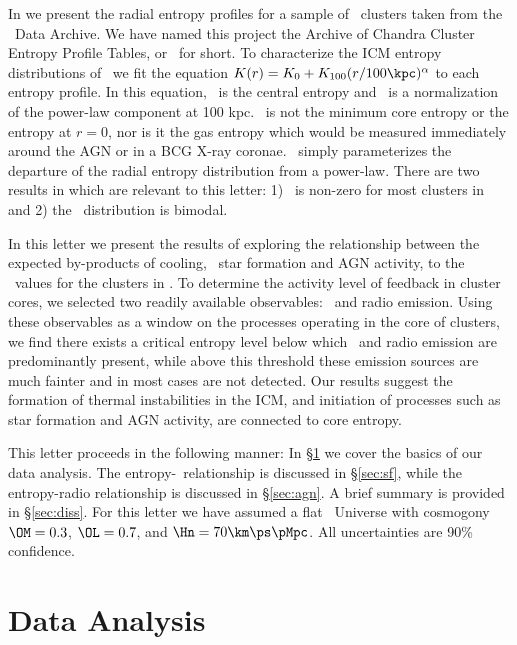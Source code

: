 \documentclass{emulateapj}
\begin{document}
In \cite{accept} we present the radial entropy profiles for a sample
of \clnum\ clusters taken from the \Chandra\ Data Archive. We have
named this project the Archive of Chandra Cluster Entropy Profile
Tables, or \accept\ for short. To characterize the ICM entropy
distributions of \accept\ we fit the equation $K(r) = K_0
+K_{100}(r/100 \kpc)^{\alpha}$ to each entropy profile. In this
equation, \kna\ is the central entropy and \khun\ is a normalization
of the power-law component at 100 kpc. \kna\ is not the minimum core
entropy or the entropy at $r=0$, nor is it the gas entropy which would
be measured immediately around the AGN or in a BCG X-ray
coronae. \kna\ simply parameterizes the departure of the radial
entropy distribution from a power-law. There are two results in
\cite{accept} which are relevant to this letter: 1) \kna\ is non-zero
for most clusters in \accept\, and 2) the \kna\ distribution is
bimodal.

In this letter we present the results of exploring the relationship
between the expected by-products of cooling, \eg\ star formation and
AGN activity, to the \kna\ values for the clusters in \accept. To
determine the activity level of feedback in cluster cores, we selected
two readily available observables: \halpha\ and radio emission. Using
these observables as a window on the processes operating in the core
of clusters, we find there exists a critical entropy level below which
\halpha\ and radio emission are predominantly present, while above
this threshold these emission sources are much fainter and in most
cases are not detected. Our results suggest the formation of thermal
instabilities in the ICM, and initiation of processes such as star
formation and AGN activity, are connected to core entropy.

This letter proceeds in the following manner: In \S\ref{sec:data} we
cover the basics of our data analysis. The
entropy-\halpha\ relationship is discussed in \S\ref{sec:sf}, while
the entropy-radio relationship is discussed in \S\ref{sec:agn}. A
brief summary is provided in \S\ref{sec:diss}.  For this letter we
have assumed a flat \LCDM\ Universe with cosmogony $\OM=0.3$,
$\OL=0.7$, and $\Hn=70\km\ps\pMpc$. All uncertainties are 90\%
confidence.

\section{Data Analysis}
\label{sec:data}
\end{document}
